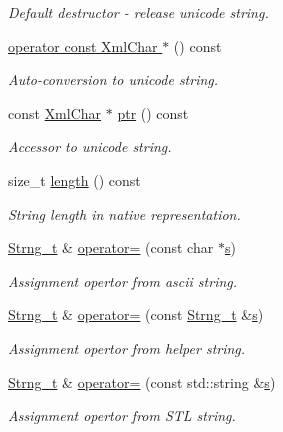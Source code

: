 \begin{DoxyCompactItemize}
\begin{DoxyCompactList}\small\item\em Default destructor -\/ release unicode string. \end{DoxyCompactList}\item 
\hyperlink{class_d_d4hep_1_1_x_m_l_1_1_strng__t_a879a62db4e9db8fac41eff74fd991334}{operator const Xml\+Char $\ast$} () const
\begin{DoxyCompactList}\small\item\em Auto-\/conversion to unicode string. \end{DoxyCompactList}\item 
const \hyperlink{namespace_d_d4hep_1_1_x_m_l_a09e5d9cc86ed782f6826dfe0778c1815}{Xml\+Char} $\ast$ \hyperlink{class_d_d4hep_1_1_x_m_l_1_1_strng__t_a67fce43bb47154ceffbae6b63746ba58}{ptr} () const
\begin{DoxyCompactList}\small\item\em Accessor to unicode string. \end{DoxyCompactList}\item 
size\+\_\+t \hyperlink{class_d_d4hep_1_1_x_m_l_1_1_strng__t_afac809f38bc57134efc49101e28bad8f}{length} () const
\begin{DoxyCompactList}\small\item\em String length in native representation. \end{DoxyCompactList}\item 
\hyperlink{class_d_d4hep_1_1_x_m_l_1_1_strng__t}{Strng\+\_\+t} \& \hyperlink{class_d_d4hep_1_1_x_m_l_1_1_strng__t_a787c32e2ab4f24fff13bb8b9a059ca3c}{operator=} (const char $\ast$\hyperlink{_volumes_8cpp_a17ca6bfc8040d695d3cada22a4763d40}{s})
\begin{DoxyCompactList}\small\item\em Assignment opertor from ascii string. \end{DoxyCompactList}\item 
\hyperlink{class_d_d4hep_1_1_x_m_l_1_1_strng__t}{Strng\+\_\+t} \& \hyperlink{class_d_d4hep_1_1_x_m_l_1_1_strng__t_a27581bce0d2c52f93ca9cf5151779c5d}{operator=} (const \hyperlink{class_d_d4hep_1_1_x_m_l_1_1_strng__t}{Strng\+\_\+t} \&\hyperlink{_volumes_8cpp_a17ca6bfc8040d695d3cada22a4763d40}{s})
\begin{DoxyCompactList}\small\item\em Assignment opertor from helper string. \end{DoxyCompactList}\item 
\hyperlink{class_d_d4hep_1_1_x_m_l_1_1_strng__t}{Strng\+\_\+t} \& \hyperlink{class_d_d4hep_1_1_x_m_l_1_1_strng__t_a07a428c2011b4dfff17ef71bfe77e572}{operator=} (const std\+::string \&\hyperlink{_volumes_8cpp_a17ca6bfc8040d695d3cada22a4763d40}{s})
\begin{DoxyCompactList}\small\item\em Assignment opertor from S\+TL string. \end{DoxyCompactList}\end{DoxyCompactItemize}
